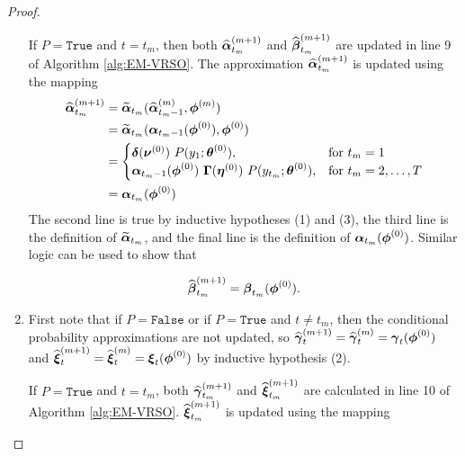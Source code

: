 \begin{proof}
\begin{enumerate}
        If $P = \texttt{True}$ and $t = t_m$, then both $\widehat {\boldsymbol{\alpha}}^{(m+1)}_{t_m}$ and $\widehat {\boldsymbol{\beta}}^{(m+1)}_{t_m}$ are updated in line 9 of Algorithm \ref{alg:EM-VRSO}. The approximation $\widehat {\boldsymbol{\alpha}}^{(m+1)}_{t_m}$ is updated using the mapping 
        \begin{align}
            \widehat {\boldsymbol{\alpha}}^{(m+1)}_{t_m} &= \widetilde {\boldsymbol{\alpha}}_{t_m}(\widehat {\boldsymbol{\alpha}}^{(m)}_{t_m-1},\boldsymbol{\phi}^{(m)}) \nonumber \\
            &= \widetilde {\boldsymbol{\alpha}}_{t_m}(\boldsymbol{\alpha}_{t_m-1}(\boldsymbol{\phi}^{(0)}),\boldsymbol{\phi}^{(0)}) \nonumber \\
            &= 
            \begin{cases}
                \boldsymbol{\delta}(\boldsymbol{\nu}^{(0)}) ~ P(y_1;\boldsymbol{\theta}^{(0)}), & \text{for } t_m = 1 \\
                \boldsymbol{\alpha}_{t_m-1}(\boldsymbol{\phi}^{(0)}) ~ \boldsymbol{\Gamma}(\boldsymbol{\eta}^{(0)}) ~P(y_{t_m};\boldsymbol{\theta}^{(0)}), & \text{for } t_m = 2,\ldots,T
            \end{cases} \nonumber \\
            &= \boldsymbol{\alpha}_{t_m}(\boldsymbol{\phi}^{(0)}) \label{eqn:a_inductive_step}
        \end{align}
        The second line is true by inductive hypotheses (1) and (3), the third line is the definition of $\widetilde {\boldsymbol{\alpha}}_{t_m}$, and the final line is the definition of $\boldsymbol{\alpha}_{t_m}(\boldsymbol{\phi}^{(0)})$. Similar logic can be used to show that 
        
        \begin{equation}
            \widehat {\boldsymbol{\beta}}^{(m+1)}_{t_m} = \boldsymbol{\beta}_{t_m}(\boldsymbol{\phi}^{(0)}). \label{eqn:b_inductive_step}
        \end{equation}
        \item First note that if $P = \texttt{False}$ or if $P = \texttt{True}$ and $t \neq t_m$, then the conditional probability approximations are not updated, so $\widehat {\boldsymbol{\gamma}}^{(m+1)}_t = \widehat {\boldsymbol{\gamma}}^{(m)}_t = \boldsymbol{\gamma}_t(\boldsymbol{\phi}^{(0)})$ and $\widehat {\boldsymbol{\xi}}^{(m+1)}_t = \widehat {\boldsymbol{\xi}}^{(m)}_t = \boldsymbol{\xi}_t(\boldsymbol{\phi}^{(0)})$ by inductive hypothesis (2).
        
        If $P = \texttt{True}$ and $t = t_m$, both $\widehat {\boldsymbol{\gamma}}^{(m+1)}_{t_m}$ and $\widehat {\boldsymbol{\xi}}^{(m+1)}_{t_m}$ are calculated in line 10 of Algorithm \ref{alg:EM-VRSO}. $\widehat {\boldsymbol{\xi}}^{(m+1)}_{t_m}$ is updated using the mapping 
        

\end{enumerate}
\end{proof}
